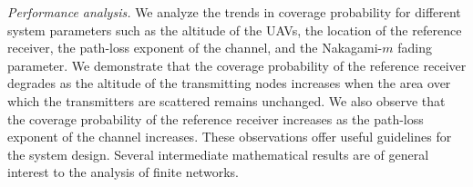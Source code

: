 \documentclass[journal,draftclsnofoot,onecolumn,12pt]{IEEEtran}
\begin{document}
{\em{Performance analysis.}} We analyze the trends in coverage probability for different system parameters such as the altitude of the UAVs, the location of the reference receiver, the path-loss exponent of the channel, and the Nakagami-$m$ fading parameter. We demonstrate that the coverage probability of the reference receiver degrades as the altitude of the transmitting nodes increases when the area over which the transmitters are scattered remains unchanged. We also observe that the coverage probability of the reference receiver increases as the path-loss exponent of the channel increases. These observations offer useful guidelines for the system design. Several intermediate mathematical results are of general interest to the analysis of finite networks.
 
\end{document}
